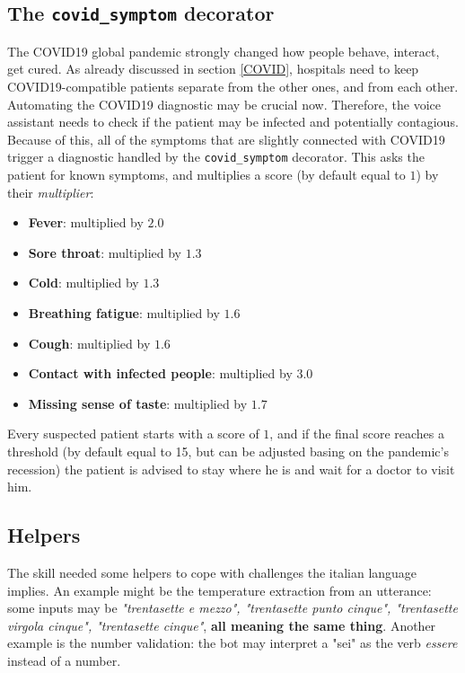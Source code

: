 \documentclass[conference]{IEEEtran}
\begin{document}
\subsection{The \texttt{covid\_symptom} decorator}
The COVID19 global pandemic strongly changed how people behave, interact, get cured. As already discussed in section \ref{COVID}, hospitals need to keep COVID19-compatible patients separate from the other ones, and from each other. Automating the COVID19 diagnostic may be crucial now. Therefore, the voice assistant needs to check if the patient may be infected and potentially contagious.
Because of this, all of the symptoms that are slightly connected with COVID19 trigger a diagnostic handled by the \texttt{covid\_symptom} decorator.
This asks the patient for known symptoms, and multiplies a score (by default equal to $1$) by their \textit{multiplier}:
\begin{itemize}
    \item \textbf{Fever}: multiplied by $2.0$
    \item \textbf{Sore throat}: multiplied by $1.3$
    \item \textbf{Cold}: multiplied by $1.3$
    \item \textbf{Breathing fatigue}: multiplied by $1.6$
    \item \textbf{Cough}: multiplied by $1.6$
    \item \textbf{Contact with infected people}: multiplied by $3.0$
    \item \textbf{Missing sense of taste}: multiplied by $1.7$
\end{itemize}
Every suspected patient starts with a score of $1$, and if the final score reaches a threshold (by default equal to 15, but can be adjusted basing on the pandemic's recession) the patient is advised to stay where he is and wait for a doctor to visit him.
\subsection{Helpers}
The skill needed some helpers to cope with challenges the italian language implies. An example might be the temperature extraction from an utterance: some inputs may be \textit{"trentasette e mezzo", "trentasette punto cinque", "trentasette virgola cinque", "trentasette cinque"}, \textbf{all meaning the same thing}. Another example is the number validation: the bot may interpret a "sei" as the verb \textit{essere} instead of a number.
\end{document}
